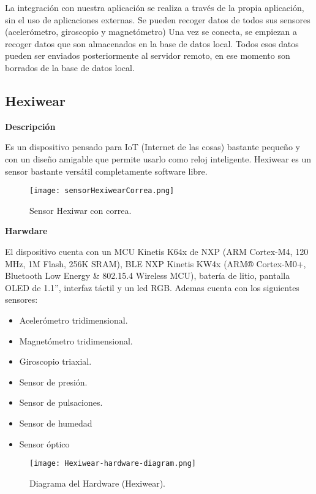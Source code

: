 \documentclass[11pt,spanish]{article}
\begin{document}
La integración con nuestra aplicación se realiza a través de la propia aplicación, sin el uso de aplicaciones externas. Se pueden recoger datos de todos sus sensores (acelerómetro, giroscopio y magnetómetro) Una vez se conecta, se empiezan a recoger datos que son almacenados en la base de datos local. Todos esos datos pueden ser enviados posteriormente al servidor remoto, en ese momento son borrados de la base de datos local.

\subsection{Hexiwear}
{\bf Descripción}
\newline

Es un dispositivo pensado para IoT (Internet de las cosas) bastante pequeño y con un diseño amigable que permite usarlo como reloj inteligente. Hexiwear es un sensor bastante versátil completamente software libre.
\newline

\begin{figure}[h!]
  \centering
  \texttt{[image: sensorHexiwearCorrea.png]}
  \caption{Sensor Hexiwar con correa.}
\end{figure}
\newpage

{\bf Harwdare}
\newline

El dispositivo cuenta con un MCU Kinetis K64x de NXP (ARM Cortex-M4, 120 MHz, 1M Flash, 256K SRAM), BLE NXP Kinetis KW4x (ARM® Cortex-M0+, Bluetooth Low Energy \& 802.15.4 Wireless MCU), batería de litio, pantalla OLED
de 1.1'', interfaz táctil y un led RGB. Ademas cuenta con los siguientes sensores:

\begin{itemize}
  \item Acelerómetro tridimensional.
  \item Magnetómetro tridimensional.
  \item Giroscopio triaxial.
  \item Sensor de presión.
  \item Sensor de pulsaciones.
  \item Sensor de humedad
  \item Sensor óptico
\end{itemize}

\begin{figure}[H]
  \centering
  \texttt{[image: Hexiwear-hardware-diagram.png]}
  \caption{Diagrama del Hardware (Hexiwear).}
\end{figure}
\end{document}
